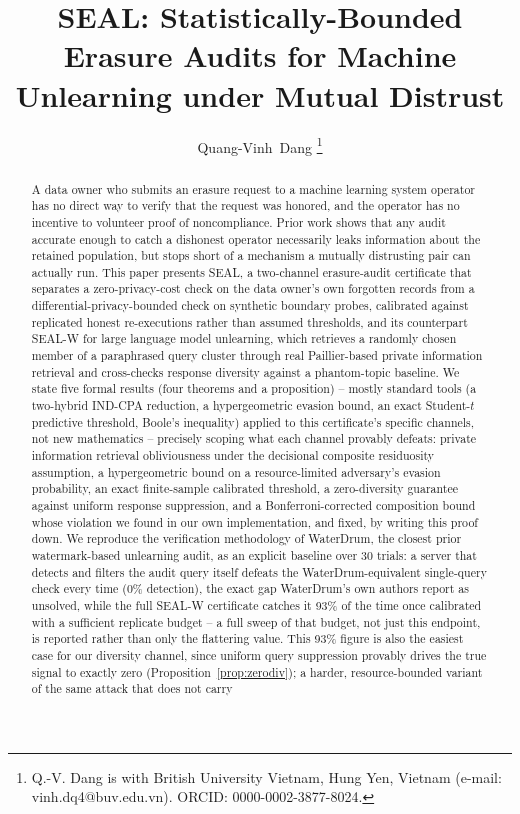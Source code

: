 \documentclass[10pt,journal,compsoc]{IEEEtran}
\begin{document}
\title{SEAL: Statistically-Bounded Erasure Audits for Machine Unlearning under Mutual Distrust}

\author{Quang-Vinh~Dang
\thanks{Q.-V. Dang is with British University Vietnam, Hung Yen, Vietnam (e-mail: vinh.dq4@buv.edu.vn). ORCID: 0000-0002-3877-8024.}
}


\maketitle

\begin{abstract}
A data owner who submits an erasure request to a machine learning system operator has no direct way to verify that the request was honored, and the operator has no incentive to volunteer proof of noncompliance. Prior work shows that any audit accurate enough to catch a dishonest operator necessarily leaks information about the retained population, but stops short of a mechanism a mutually distrusting pair can actually run. This paper presents SEAL, a two-channel erasure-audit certificate that separates a zero-privacy-cost check on the data owner's own forgotten records from a differential-privacy-bounded check on synthetic boundary probes, calibrated against replicated honest re-executions rather than assumed thresholds, and its counterpart SEAL-W for large language model unlearning, which retrieves a randomly chosen member of a paraphrased query cluster through real Paillier-based private information retrieval and cross-checks response diversity against a phantom-topic baseline. We state five formal results (four theorems and a proposition) -- mostly standard tools (a two-hybrid IND-CPA reduction, a hypergeometric evasion bound, an exact Student-$t$ predictive threshold, Boole's inequality) applied to this certificate's specific channels, not new mathematics -- precisely scoping what each channel provably defeats: private information retrieval obliviousness under the decisional composite residuosity assumption, a hypergeometric bound on a resource-limited adversary's evasion probability, an exact finite-sample calibrated threshold, a zero-diversity guarantee against uniform response suppression, and a Bonferroni-corrected composition bound whose violation we found in our own implementation, and fixed, by writing this proof down. We reproduce the verification methodology of WaterDrum, the closest prior watermark-based unlearning audit, as an explicit baseline over 30 trials: a server that detects and filters the audit query itself defeats the WaterDrum-equivalent single-query check every time (0\% detection), the exact gap WaterDrum's own authors report as unsolved, while the full SEAL-W certificate catches it 93\% of the time once calibrated with a sufficient replicate budget -- a full sweep of that budget, not just this endpoint, is reported rather than only the flattering value. This 93\% figure is also the easiest case for our diversity channel, since uniform query suppression provably drives the true signal to exactly zero (Proposition~\ref{prop:zerodiv}); a harder, resource-bounded variant of the same attack that does not carry 
\end{abstract}
\end{document}
